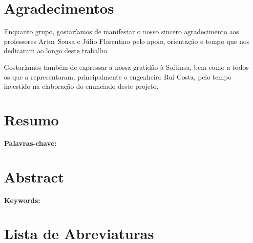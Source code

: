 \documentclass[12pt,a4paper]{report}
\begin{document}

\chapter*{Agradecimentos}

Enquanto grupo, gostaríamos de manifestar o nosso sincero agradecimento aos professores Artur Sousa e Júlio Florentino pelo apoio, orientação e tempo que nos dedicaram ao longo deste trabalho.

Gostaríamos também de expressar a nossa gratidão à Softinsa, bem como a todos os que a representaram, principalmente o engenheiro Rui Costa, pelo tempo investido na elaboração do enunciado deste projeto.

\newpage

\chapter*{Resumo}


\vspace{1cm}
\noindent\textbf{Palavras-chave:} %

\newpage

\chapter*{Abstract}


\vspace{1cm}
\noindent\textbf{Keywords:} %

\newpage

\chapter*{Lista de Abreviaturas}
\end{document}
